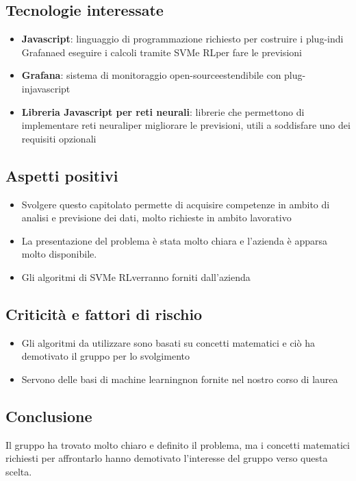 \subsection{Tecnologie interessate}
\begin{itemize}
	\item \textbf{Javascript}: linguaggio di programmazione richiesto per costruire i plug-in\glosp di Grafana\glosp ed eseguire i calcoli tramite SVM\glosp e RL\glosp per fare le previsioni
	\item \textbf{Grafana}: sistema di monitoraggio open-source\glosp estendibile con plug-in\glosp javascript\glo
	\item \textbf{Libreria Javascript per reti neurali}: librerie che permettono di implementare reti neurali\glosp per migliorare le previsioni, utili a soddisfare uno dei requisiti opzionali
\end{itemize}
 
\subsection{Aspetti positivi}
\begin{itemize} 
	\item Svolgere questo capitolato permette di acquisire competenze in ambito di analisi e previsione dei dati, molto richieste in ambito lavorativo
	\item La presentazione del problema è stata molto chiara e l'azienda è apparsa molto disponibile.
	\item Gli algoritmi di SVM\glosp e RL\glosp verranno forniti dall'azienda
\end{itemize}
\subsection{Criticità e fattori di rischio}
\begin{itemize}
	\item Gli algoritmi da utilizzare sono basati su concetti matematici e ciò ha demotivato il gruppo per lo svolgimento 
	\item Servono delle basi di machine learning\glosp non fornite nel nostro corso di laurea
\end{itemize}
\subsection{Conclusione}
Il gruppo ha trovato molto chiaro e definito il problema, ma i concetti matematici richiesti per affrontarlo hanno demotivato l'interesse del gruppo verso questa scelta.